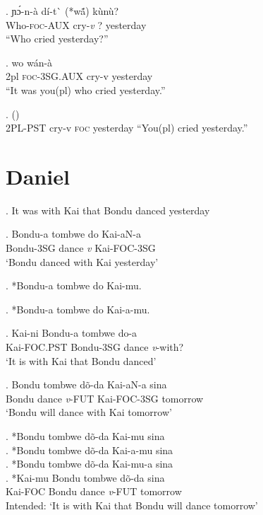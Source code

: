\documentclass{assets/fieldnotes}
\begin{document}
\exg. ɲɔ́-n-à dí-t\`{} (*wã́) kùnù?\\
Who-\textsc{foc-AUX} cry-\textit{v} ? yesterday\\
``Who cried yesterday?''

\exg. wo wán-à  \\
2pl \textsc{foc-3SG.AUX} cry-v yesterday\\
``It was you(pl) who cried yesterday.''

\ex.   () \\
2\textsc{PL-PST} cry-v \textsc{foc} yesterday
``You(pl) cried yesterday.'' 


\section{Daniel}

\ex. It was with Kai that Bondu danced yesterday

\exg. Bondu-a tombwe do Kai-aN-a\\
Bondu-3SG dance \textit{v} Kai-FOC-3SG\\
`Bondu danced with Kai yesterday'

\ex. *Bondu-a tombwe do Kai-mu.

\ex. *Bondu-a tombwe do Kai-a-mu.

\exg. Kai-ni Bondu-a tombwe do-a\\
Kai-FOC.PST Bondu-3SG dance \textit{v}-with?\\
`It is with Kai that Bondu danced'

\exg. Bondu tombwe dõ-da Kai-aN-a sina\\
Bondu dance \textit{v}-FUT Kai-FOC-3SG tomorrow\\
`Bondu will dance with Kai tomorrow'

\ex. *Bondu tombwe dõ-da Kai-mu sina\\

\ex. *Bondu tombwe dõ-da Kai-a-mu sina\\

\ex. *Bondu tombwe dõ-da Kai-mu-a sina\\

\exg. *Kai-mu Bondu tombwe dõ-da sina\\
Kai-FOC Bondu dance \textit{v}-FUT tomorrow\\
Intended: `It is with Kai that Bondu will dance tomorrow'
\end{document}
